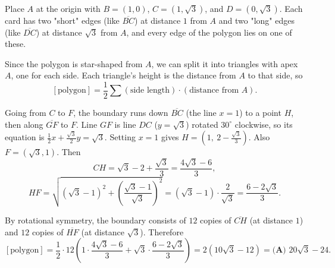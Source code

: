 \begin{enumerate}
 Place $A$ at the origin with $B = (1, 0)$, $C = (1, \sqrt{3})$, and $D = (0, \sqrt{3})$. Each card has two "short" edges (like $\overline{BC}$) at distance $1$ from $A$ and two "long" edges (like $\overline{DC}$) at distance $\sqrt{3}$ from $A$, and every edge of the polygon lies on one of these.

 Since the polygon is star-shaped from $A$, we can split it into triangles with apex $A$, one for each side. Each triangle's height is the distance from $A$ to that side, so
 \[[\text{polygon}] = \frac{1}{2}\sum (\text{side length})\cdot(\text{distance from } A).\]

 Going from $C$ to $F$, the boundary runs down $\overline{BC}$ (the line $x = 1$) to a point $H$, then along $\overline{GF}$ to $F$. Line $GF$ is line $DC$ ($y = \sqrt{3}$) rotated $30^\circ$ clockwise, so its equation is $\frac{1}{2}x + \frac{\sqrt{3}}{2}y = \sqrt{3}$. Setting $x = 1$ gives $H = \left(1,\ 2 - \frac{\sqrt{3}}{3}\right)$. Also $F = (\sqrt{3}, 1)$. Then
 \[CH = \sqrt{3} - 2 + \frac{\sqrt{3}}{3} = \frac{4\sqrt{3} - 6}{3},\]
 \[HF = \sqrt{(\sqrt{3}-1)^2 + \left(\frac{\sqrt{3}-1}{\sqrt{3}}\right)^2} = (\sqrt{3}-1)\cdot\frac{2}{\sqrt{3}} = \frac{6 - 2\sqrt{3}}{3}.\]

 By rotational symmetry, the boundary consists of $12$ copies of $\overline{CH}$ (at distance $1$) and $12$ copies of $\overline{HF}$ (at distance $\sqrt{3}$). Therefore
 \[[\text{polygon}] = \frac{1}{2}\cdot 12\left(1\cdot\frac{4\sqrt{3}-6}{3} + \sqrt{3}\cdot\frac{6-2\sqrt{3}}{3}\right) = 2\left(10\sqrt{3} - 12\right) = \boxed{\textbf{(A) }20\sqrt{3}-24}.\]



\end{enumerate}